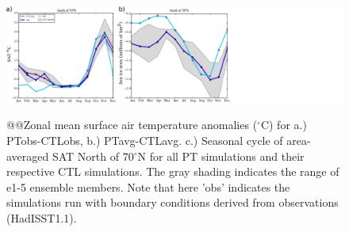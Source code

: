 \documentclass[twocol]{ametsoc}
\begin{document}

\begin{figure}[t]
  \noindent\includegraphics[width=39pc,angle=0]{seacycles.pdf}\\
  \caption{@@Zonal mean surface air temperature anomalies ($^\circ$C) for a.) PTobs-CTLobs, b.) PTavg-CTLavg. c.) Seasonal cycle of area-averaged SAT North of 70$^\circ$N for all PT simulations and their respective CTL simulations. The gray shading indicates the range of e1-5 ensemble members. Note that here 'obs' indicates the simulations run with boundary conditions derived from observations (HadISST1.1).
}\label{f3}
\end{figure}

%
\end{document}
